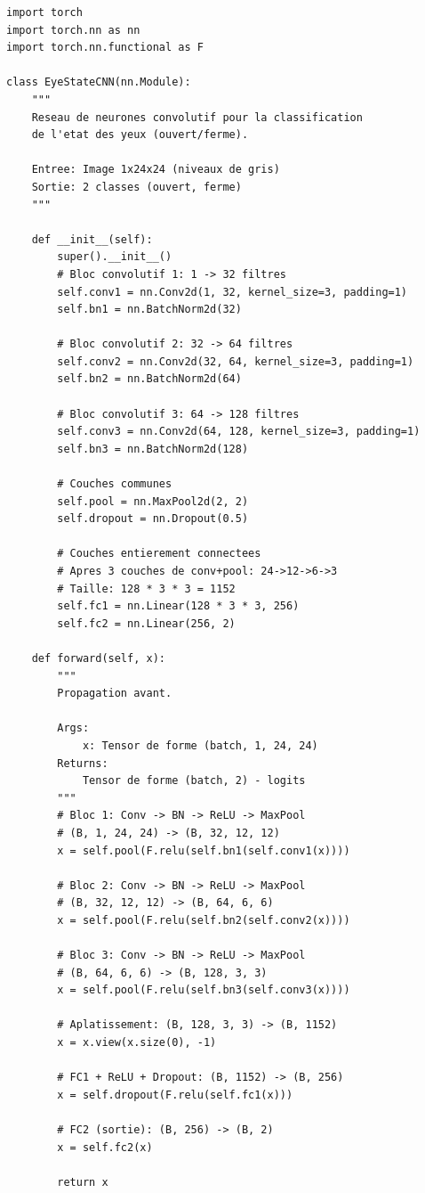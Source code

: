\documentclass[12pt,a4paper,twoside]{report}
\begin{document}
\begin{lstlisting}[style=pythonstyle, caption={Architecture complète du EyeStateCNN.}, label={lst:eye_cnn}]
import torch
import torch.nn as nn
import torch.nn.functional as F

class EyeStateCNN(nn.Module):
    """
    Reseau de neurones convolutif pour la classification
    de l'etat des yeux (ouvert/ferme).
    
    Entree: Image 1x24x24 (niveaux de gris)
    Sortie: 2 classes (ouvert, ferme)
    """
    
    def __init__(self):
        super().__init__()
        # Bloc convolutif 1: 1 -> 32 filtres
        self.conv1 = nn.Conv2d(1, 32, kernel_size=3, padding=1)
        self.bn1 = nn.BatchNorm2d(32)
        
        # Bloc convolutif 2: 32 -> 64 filtres
        self.conv2 = nn.Conv2d(32, 64, kernel_size=3, padding=1)
        self.bn2 = nn.BatchNorm2d(64)
        
        # Bloc convolutif 3: 64 -> 128 filtres
        self.conv3 = nn.Conv2d(64, 128, kernel_size=3, padding=1)
        self.bn3 = nn.BatchNorm2d(128)
        
        # Couches communes
        self.pool = nn.MaxPool2d(2, 2)
        self.dropout = nn.Dropout(0.5)
        
        # Couches entierement connectees
        # Apres 3 couches de conv+pool: 24->12->6->3
        # Taille: 128 * 3 * 3 = 1152
        self.fc1 = nn.Linear(128 * 3 * 3, 256)
        self.fc2 = nn.Linear(256, 2)
    
    def forward(self, x):
        """
        Propagation avant.
        
        Args:
            x: Tensor de forme (batch, 1, 24, 24)
        Returns:
            Tensor de forme (batch, 2) - logits
        """
        # Bloc 1: Conv -> BN -> ReLU -> MaxPool
        # (B, 1, 24, 24) -> (B, 32, 12, 12)
        x = self.pool(F.relu(self.bn1(self.conv1(x))))
        
        # Bloc 2: Conv -> BN -> ReLU -> MaxPool
        # (B, 32, 12, 12) -> (B, 64, 6, 6)
        x = self.pool(F.relu(self.bn2(self.conv2(x))))
        
        # Bloc 3: Conv -> BN -> ReLU -> MaxPool
        # (B, 64, 6, 6) -> (B, 128, 3, 3)
        x = self.pool(F.relu(self.bn3(self.conv3(x))))
        
        # Aplatissement: (B, 128, 3, 3) -> (B, 1152)
        x = x.view(x.size(0), -1)
        
        # FC1 + ReLU + Dropout: (B, 1152) -> (B, 256)
        x = self.dropout(F.relu(self.fc1(x)))
        
        # FC2 (sortie): (B, 256) -> (B, 2)
        x = self.fc2(x)
        
        return x
\end{lstlisting}
\end{document}
